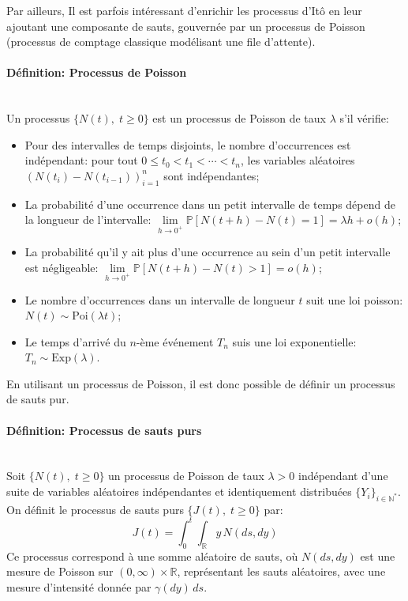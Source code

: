 Par ailleurs, Il est parfois intéressant d'enrichir les processus d'Itô en leur ajoutant une composante de sauts, gouvernée par un processus de Poisson (processus de comptage classique modélisant une file d'attente).
\paragraph{Définition: Processus de Poisson}\mbox{}\\
Un processus $\{N(t),\;t\geq0\}$ est un processus de Poisson de taux $\lambda$ s'il vérifie:
\begin{itemize}
    \item Pour des intervalles de temps disjoints, le nombre d'occurrences est indépendant: pour tout $0 \leq t_0 < t_1 < \cdots < t_n$, les variables aléatoires ${\left(N(t_i) - N(t_{i-1})\right)}_{i=1}^n$ sont indépendantes;
    \item La probabilité d'une occurrence dans un petit intervalle de temps dépend de la longueur de l'intervalle: $\underset{h\to0^+}{\lim}\mathds{P}[N(t+h)-N(t)=1]=\lambda h+o(h)$;
    \item La probabilité qu'il y ait plus d'une occurrence au sein d'un petit intervalle est négligeable: $\underset{h\to0^+}{\lim}\mathds{P}[N(t+h)-N(t)>1]=o(h)$;
    \item Le nombre d'occurrences dans un intervalle de longueur $t$ suit une loi poisson: $N(t)\sim \text{Poi}(\lambda t)$;
    \item Le temps d'arrivé du $n$-ème événement $T_n$ suis une loi exponentielle: $T_n\sim\text{Exp}(\lambda)$.
\end{itemize}
En utilisant un processus de Poisson, il est donc possible de définir un processus de sauts pur.
\paragraph{Définition: Processus de sauts purs}\mbox{}\\
Soit $\{N(t),\;t \geq 0\}$ un processus de Poisson de taux $\lambda > 0$ indépendant d'une suite de variables aléatoires indépendantes et identiquement distribuées $\{Y_i\}_{i \in \mathds{N}^*}$. On définit le processus de sauts purs $\{J(t),\;t \geq 0\}$ par:
\begin{equation}\label{jump_def}
    J(t) = \int_0^t \int_{\mathds{R}}y\,N(ds,dy)
\end{equation}
Ce processus correspond à une somme aléatoire de sauts, où \( N(ds,dy) \) est une mesure de Poisson sur \( (0, \infty) \times \mathds{R} \), représentant les sauts aléatoires, avec une mesure d'intensité donnée par \(\gamma(dy)\,ds\).

